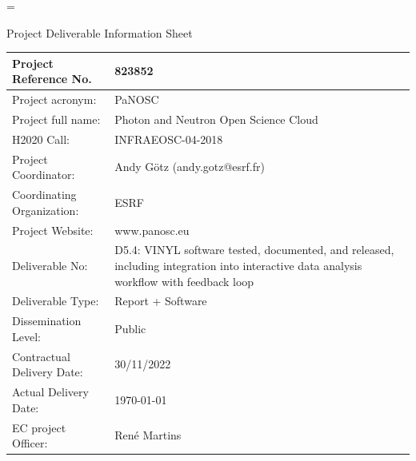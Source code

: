 \documentclass[11pt, a4paper]{article}
\edef\restoreparindent{\parindent=\the\parindent\relax}
\begin{document}
\newpage

\fancyfoot{} %
\fancyfoot[R]{\thepage}


{ %
\restoreparindent

{\sffamily\huge Project Deliverable Information Sheet \par}

\begin{center}
\begin{tabular}{ | m{5.2cm}| m{10.7cm} | }
\hline
Project Reference No. & 823852 \\
\hline
Project acronym: & PaNOSC \\
\hline
Project full name: & Photon and Neutron Open Science Cloud \\
\hline
H2020 Call: & INFRAEOSC-04-2018 \\
\hline
Project Coordinator: & Andy Götz (andy.gotz@esrf.fr) \\
\hline
Coordinating Organization: & ESRF \\
\hline
Project Website: & www.panosc.eu \\
\hline
  Deliverable No: & D5.4: VINYL software tested, documented, and released, including integration into interactive data analysis workflow with feedback loop \\
\hline
Deliverable Type: & Report + Software \\
\hline
Dissemination Level: & Public \\
\hline
Contractual Delivery Date: & 30/11/2022 \\
\hline
Actual Delivery Date: & \today \\
\hline
EC project Officer: & Ren\'e Martins \\
\hline
\end{tabular}
\end{center}

}
\end{document}
